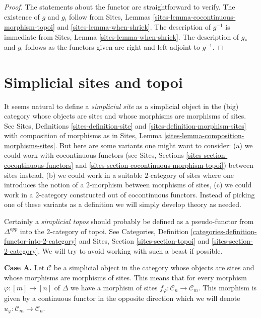 \begin{proof}
The statements about the functor are straightforward to verify.
The existence of $g$ and $g_!$ follow from
Sites, Lemmas \ref{sites-lemma-cocontinuous-morphism-topoi} and
\ref{sites-lemma-when-shriek}. The description of
$g^{-1}$ is immediate from Sites, Lemma \ref{sites-lemma-when-shriek}.
The description of $g_*$ and $g_!$ follows as the functors given are
right and left adjoint to $g^{-1}$.
\end{proof}








\section{Simplicial sites and topoi}
\label{section-simplicial-sites}

\noindent
It seems natural to define a {\it simplicial site} as a simplicial
object in the (big) category whose objects are sites
and whose morphisms are morphisms of sites.
See Sites, Definitions \ref{sites-definition-site} and
\ref{sites-definition-morphism-sites}
with composition of morphisms as in 
Sites, Lemma \ref{sites-lemma-composition-morphisms-sites}.
But here are some variants one might want to consider:
(a) we could work with cocontinuous functors
(see Sites, Sections \ref{sites-section-cocontinuous-functors} and
\ref{sites-section-cocontinuous-morphism-topoi}) between sites instead,
(b) we could work in a suitable $2$-category of sites where one introduces
the notion of a $2$-morphism between morphisms of sites,
(c) we could work in a $2$-category constructed out of cocontinuous
functors. Instead of picking one of these variants as a definition
we will simply develop theory as needed.

\medskip\noindent
Certainly a {\it simplicial topos} should probably be defined as a
pseudo-functor from $\Delta^{opp}$ into the $2$-category of topoi.
See Categories, Definition \ref{categories-definition-functor-into-2-category}
and Sites, Section \ref{sites-section-topoi} and
\ref{sites-section-2-category}. We will try to avoid working with such
a beast if possible.

\medskip\noindent
{\bf Case A.}
Let $\mathcal{C}$ be a simplicial object in the category whose objects
are sites and whose morphisms are morphisms of sites. This means that
for every morphism $\varphi : [m] \to [n]$ of $\Delta$ we have a morphism
of sites $f_\varphi : \mathcal{C}_n \to \mathcal{C}_m$. This morphism is
given by a continuous functor in the opposite direction which we will denote
$u_\varphi : \mathcal{C}_m \to \mathcal{C}_n$.

